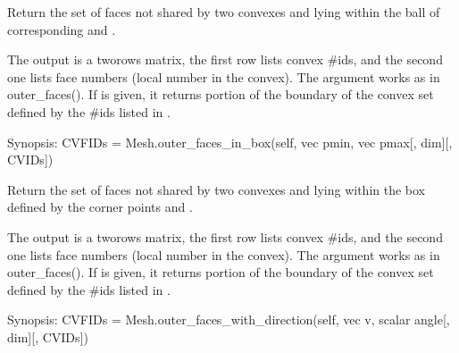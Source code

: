 \documentclass[a4paper,11pt,english]{sphinxmanual}
\begin{document}
\begin{fulllineitems}
\begin{fulllineitems}
Return the set of faces not shared by two convexes and lying within the ball of corresponding  and .

The output  is a two\sphinxhyphen{}rows matrix, the first row lists convex
\#ids, and the second one lists face numbers (local number in the
convex). The argument  works as in outer\_faces().
If  is given, it returns portion of the boundary of
the convex set defined by the \#ids listed in .

\end{fulllineitems}


\begin{fulllineitems}
\label{\detokenize{python/cmdref_Mesh:getfem.Mesh.outer_faces_in_box}}
Synopsis: CVFIDs = Mesh.outer\_faces\_in\_box(self, vec pmin, vec pmax{[}, dim{]}{[}, CVIDs{]})

Return the set of faces not shared by two convexes and lying within the box defined by the corner points  and .

The output  is a two\sphinxhyphen{}rows matrix, the first row lists convex
\#ids, and the second one lists face numbers (local number in the
convex). The argument  works as in outer\_faces().
If  is given, it returns portion of the boundary of
the convex set defined by the \#ids listed in .

\end{fulllineitems}


\begin{fulllineitems}
\label{\detokenize{python/cmdref_Mesh:getfem.Mesh.outer_faces_with_direction}}
Synopsis: CVFIDs = Mesh.outer\_faces\_with\_direction(self, vec v, scalar angle{[}, dim{]}{[}, CVIDs{]})


\end{fulllineitems}
\end{fulllineitems}
\end{document}
